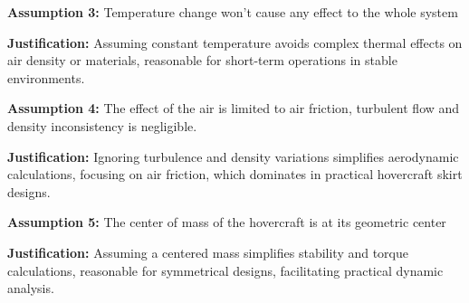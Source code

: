 \textbf{Assumption 3:} Temperature change won't cause any effect to the whole system

\textbf{Justification:} Assuming constant temperature avoids complex thermal effects on air density or materials, reasonable for short-term operations in stable environments.

\textbf{Assumption 4:} The effect of the air is limited to air friction, turbulent flow and density inconsistency is negligible. 

\textbf{Justification:} Ignoring turbulence and density variations simplifies aerodynamic calculations, focusing on air friction, which dominates in practical hovercraft skirt designs.

\textbf{Assumption 5:} The center of mass of the hovercraft is at its geometric center

\textbf{Justification:} Assuming a centered mass simplifies stability and torque calculations, reasonable for symmetrical designs, facilitating practical dynamic analysis.


